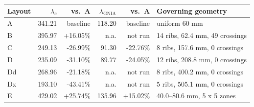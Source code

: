 \begin{tabular}{lrrrrl}
\toprule
Layout & $\lambda_c$ & vs.\ A & $\lambda_{\mathrm{GNIA}}$ & vs.\ A & Governing geometry \\
\midrule
A & 341.21 & baseline & 118.20 & baseline & uniform 60 mm \\
B & 395.97 & +16.05\% & n.a. & not run & 14 ribs, 62.4 mm, 49 crossings \\
C & 249.13 & -26.99\% & 91.30 & -22.76\% & 8 ribs, 157.6 mm, 0 crossings \\
D & 235.09 & -31.10\% & 89.77 & -24.05\% & 12 ribs, 208.8 mm, 0 crossings \\
Dd & 268.96 & -21.18\% & n.a. & not run & 8 ribs, 400.2 mm, 0 crossings \\
Dx & 193.10 & -43.41\% & n.a. & not run & 5 ribs, 505.1 mm, 0 crossings \\
E & 429.02 & +25.74\% & 135.96 & +15.02\% & 40.0--80.6 mm, 5 x 5 zones \\
\bottomrule
\end{tabular}
